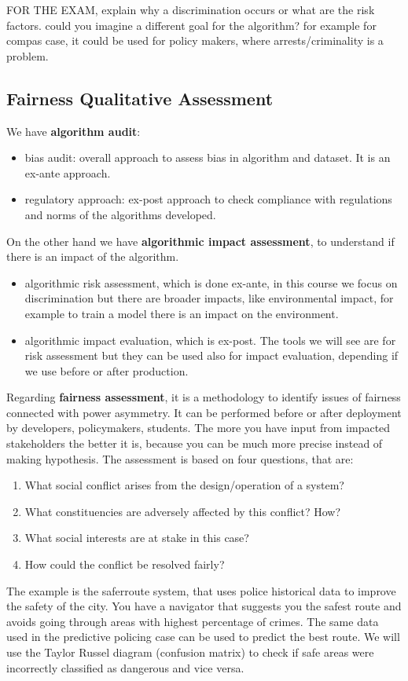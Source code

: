 FOR THE EXAM, explain why a discrimination occurs or what are the risk factors. could you imagine a different goal for the algorithm? for example for compas case, it could be used for policy makers, where arrests/criminality is a problem.

\subsection{Fairness Qualitative Assessment}
We have \textbf{algorithm audit}:
\begin{itemize}
    \item bias audit: overall approach to assess bias in algorithm and dataset. It is an ex-ante approach.
    \item regulatory approach: ex-post approach to check compliance with regulations and norms of the algorithms developed.
\end{itemize}
On the other hand we have \textbf{algorithmic impact assessment}, to understand if there is an impact of the algorithm. 
\begin{itemize}
    \item algorithmic risk assessment, which is done ex-ante, in this course we focus on discrimination but there are broader impacts, like environmental impact, for example to train a model there is an impact on the environment.
    \item algorithmic impact evaluation, which is ex-post. The tools we will see are for risk assessment but they can be used also for impact evaluation, depending if we use before or after production.
\end{itemize}
Regarding \textbf{fairness assessment}, it is a methodology to identify issues of fairness connected with power asymmetry. It can be performed before or after deployment by developers, policymakers, students. The more you have input from impacted stakeholders the better it is, because you can be much more precise instead of making hypothesis. 
The assessment is based on four questions, that are:
\begin{enumerate}
    \item What social conflict arises from the design/operation of a system? 
    \item What constituencies are adversely affected by this conflict? How?
    \item What social interests are at stake in this case?
    \item How could the conflict be resolved fairly?
\end{enumerate}
The example is the saferroute system, that uses police historical data to improve the safety of the city. You have a navigator that suggests you the safest route and avoids going through areas with highest percentage of crimes. The same data used in the predictive policing case can be used to predict the best route. We will use the Taylor Russel diagram (confusion matrix) to check if safe areas were incorrectly classified as dangerous and vice versa.
